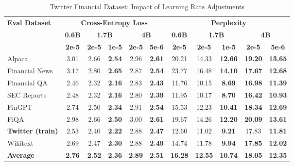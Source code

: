 
\begin{table}[h]
\centering
\caption[Twitter Financial: Learning Rate Comparison]{Twitter Financial Dataset: Impact of Learning Rate Adjustments}
\label{tab:twitter_lr_comparison}
\begin{tabular}{l|c|cc|cc|c|cc|cc}
\hline
\multirow{3}{*}{\textbf{Eval Dataset}} &
\multicolumn{5}{c|}{\textbf{Cross-Entropy Loss}} &
\multicolumn{5}{c}{\textbf{Perplexity}} \\
\cline{2-6} \cline{7-11}
& \textbf{0.6B} & \multicolumn{2}{c|}{\textbf{1.7B}} & \multicolumn{2}{c|}{\textbf{4B}} &
 \textbf{0.6B} & \multicolumn{2}{c|}{\textbf{1.7B}} & \multicolumn{2}{c}{\textbf{4B}} \\
\cline{3-4} \cline{5-6} \cline{8-9} \cline{10-11}
& \textbf{2e-5} & \textbf{2e-5} & \textbf{1e-5} & \textbf{2e-5} & \textbf{5e-6} &
 \textbf{2e-5} & \textbf{2e-5} & \textbf{1e-5} & \textbf{2e-5} & \textbf{5e-6} \\
\hline
 Alpaca & 3.01 & 2.66 & \textbf{2.54} & 2.96 & \textbf{2.61} & 20.21 & 14.33 & \textbf{12.66} & \textbf{19.20} & \textbf{13.65} \\
Financial News & 3.17 & 2.80 & \textbf{2.65} & 2.87 & \textbf{2.54} & 23.77 & 16.48 & \textbf{14.10} & \textbf{17.67} & \textbf{12.68} \\
Financial QA & 2.46 & 2.32 & \textbf{2.16} & 2.83 & \textbf{2.43} & 11.76 & 10.15 & \textbf{8.69} & \textbf{16.98} & \textbf{11.39} \\
SEC Reports & 2.48 & 2.32 & \textbf{2.16} & 2.80 & \textbf{2.39} & 11.95 & 10.17 & \textbf{8.70} & \textbf{16.42} & \textbf{10.93} \\
FinGPT & 2.74 & 2.50 & \textbf{2.34} & 2.91 & \textbf{2.54} & 15.53 & 12.23 & \textbf{10.41} & \textbf{18.34} & \textbf{12.69} \\
FiQA & 2.98 & 2.66 & \textbf{2.50} & 3.00 & \textbf{2.61} & 19.67 & 14.26 & \textbf{12.20} & \textbf{20.09} & \textbf{13.61} \\
\rowcolor{gray!20} \textbf{Twitter (train)} & 2.53 & 2.40 & \textbf{2.22} & 2.88 & \textbf{2.47} & 12.60 & 11.02 & \textbf{9.21} & 17.83 & \textbf{11.81} \\
Wikitext & 2.69 & 2.47 & \textbf{2.30} & 2.88 & \textbf{2.49} & 14.74 & 11.78 & \textbf{9.94} & \textbf{17.85} & \textbf{12.02} \\
\rowcolor{blue!10} \textbf{Average} & \textbf{2.76} & \textbf{2.52} & \textbf{2.36} & \textbf{2.89} & \textbf{2.51} & \textbf{16.28} & \textbf{12.55} & \textbf{10.74} & \textbf{18.05} & \textbf{12.35}  \\
\hline
\end{tabular}
\end{table}
